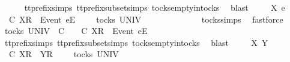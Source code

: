 \begin{isabellebody}
\ \ \ \ \isamarkupfalse%
\ tt{\isacharunderscore}prefix{\isachardot}simps{\isacharparenleft}{}{\isacharparenright}\ tt{\isacharunderscore}prefix{\isacharunderscore}subset{\isachardot}simps{\isacharparenleft}{}{\isacharparenright}\ tocks{\isachardot}empty{\isacharunderscore}in{\isacharunderscore}tocks\ \isamarkupfalse%
\ blast\isanewline
{}\isamarkupfalse%
\isanewline
\ \ \isamarkupfalse%
\ {\isasymrho}\ X\ e\ {\isasymsigma}\isanewline
\ \ \isamarkupfalse%
\ {\isachardoublequoteopen}{\isasymrho}\ {\isasymlesssim}\isactrlsub C\ {\isacharbrackleft}X{\isacharbrackright}\isactrlsub R\ {\isacharhash}\ {\isacharbrackleft}Event\ e{\isacharbrackright}\isactrlsub E\ {\isacharhash}\ {\isasymsigma}{\isachardoublequoteclose}\ {\isachardoublequoteopen}{\isasymrho}\ {\isasymin}\ tocks\ UNIV{\isachardoublequoteclose}\isanewline
\ \ \isamarkupfalse%
\ \isamarkupfalse%
\ {\isachardoublequoteopen}{\isasymrho}\ {\isacharequal}\ {\isacharbrackleft}{\isacharbrackright}{\isachardoublequoteclose}\isanewline
\ \ \ \ \isamarkupfalse%
\ tocks{\isachardot}simps\ \isamarkupfalse%
\ fastforce\isanewline
\ \ \isamarkupfalse%
\ \isamarkupfalse%
\ {\isachardoublequoteopen}{\isasymexists}{\isasymrho}{\isacharprime}{\isasymin}tocks\ UNIV{\isachardot}\ {\isasymrho}\ {\isasymlesssim}\isactrlsub C\ {\isasymrho}{\isacharprime}\ {\isasymand}\ {\isasymrho}{\isacharprime}\ {\isasymle}\isactrlsub C\ {\isacharbrackleft}X{\isacharbrackright}\isactrlsub R\ {\isacharhash}\ {\isacharbrackleft}Event\ e{\isacharbrackright}\isactrlsub E\ {\isacharhash}\ {\isasymsigma}{\isachardoublequoteclose}\isanewline
\ \ \ \ \isamarkupfalse%
\ tt{\isacharunderscore}prefix{\isachardot}simps{\isacharparenleft}{}{\isacharparenright}\ tt{\isacharunderscore}prefix{\isacharunderscore}subset{\isachardot}simps{\isacharparenleft}{}{\isacharparenright}\ tocks{\isachardot}empty{\isacharunderscore}in{\isacharunderscore}tocks\ \isamarkupfalse%
\ blast\isanewline
{}\isamarkupfalse%
\isanewline
\ \ \isamarkupfalse%
\ {\isasymrho}\ X\ Y\ {\isasymsigma}\isanewline
\ \ \isamarkupfalse%
\ {\isachardoublequoteopen}{\isasymrho}\ {\isasymlesssim}\isactrlsub C\ {\isacharbrackleft}X{\isacharbrackright}\isactrlsub R\ {\isacharhash}\ {\isacharbrackleft}Y{\isacharbrackright}\isactrlsub R\ {\isacharhash}\ {\isasymsigma}{\isachardoublequoteclose}\ {\isachardoublequoteopen}{\isasymrho}\ {\isasymin}\ tocks\ UNIV{\isachardoublequoteclose}\isanewline

\end{isabellebody}
